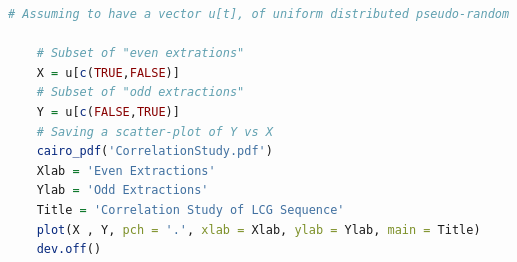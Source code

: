 \begin{lstlisting}[language=R, style=Rstyle, caption= \texttt{R} code for correlation-study of LCG random sequence]
# Assuming to have a vector u[t], of uniform distributed pseudo-random numbers...
	
	# Subset of "even extrations"
	X = u[c(TRUE,FALSE)] 
	# Subset of "odd extractions"
	Y = u[c(FALSE,TRUE)]
	# Saving a scatter-plot of Y vs X
	cairo_pdf('CorrelationStudy.pdf')
	Xlab = 'Even Extractions'
	Ylab = 'Odd Extractions'
	Title = 'Correlation Study of LCG Sequence'
	plot(X , Y, pch = '.', xlab = Xlab, ylab = Ylab, main = Title)
	dev.off()
\end{lstlisting}

\newpage
